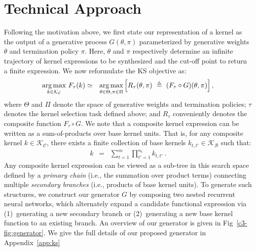 \section{Technical Approach}
\label{c3-sec:method}
Following the motivation above, we first state our representation of a kernel as the output of a generative process $G(\theta,\pi)$ parameterized by generative weights $\theta$ and termination policy $\pi$. Here, $\theta$ and $\pi$ respectively determine an infinite trajectory of kernel expressions to be synthesized and the cut-off point to return a finite expression. We now reformulate the KS objective as:
\begin{eqnarray}
\underset{k \in \mathcal{K_C}}{\operatorname{\arg\max}} \ F_{\tau}(k) &\simeq&  \underset{\theta \in \Theta, \pi \in \Pi}{\operatorname{\arg\max}} \left[ R_{\tau} (\theta,\pi) \ \triangleq \ (F_{\tau} \circ G)(\theta,\pi) \right] ,
\label{c3-prop:reformulation}
\end{eqnarray}
\noindent where $\Theta$ and $\Pi$ denote the space of generative weights and termination policies; $\tau$ denotes the kernel selection task defined above; and $R_\tau$ conveniently denotes the composite function $F_\tau \circ G$. We note that a composite kernel expression can be written as a sum-of-products over base kernel units. That is, for any composite kernel $k \in \mathcal{K_C}$, there exists a finite collection of base kernels $k_{t,t'} \in \mathcal{K_B}$ such that:
\begin{eqnarray}
k &=& \sum_{t=1}^m\prod_{t'=1}^{n_t}k_{t, t'} \ .
\label{c3-eq:general}
\end{eqnarray}
Any composite kernel expression can be viewed as a sub-tree in this search space defined by a \emph{primary chain} (i.e., the summation over product terms) connecting multiple \emph{secondary branches} (i.e., products of base kernel units). To generate such structures, we construct our generator $G$ by composing two nested recurrent neural networks, which alternately expand a candidate functional expression via (1)~generating a new secondary branch or (2)~generating a new base kernel function to an existing branch. An overview of our generator is given in Fig~\ref{c3-fig:generator}. We give the full details of our proposed generator in Appendix~\ref{app:ks}


